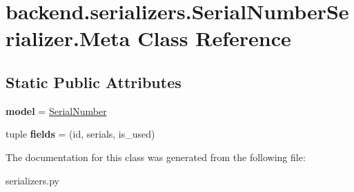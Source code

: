 \hypertarget{classbackend_1_1serializers_1_1_serial_number_serializer_1_1_meta}{}\section{backend.\+serializers.\+Serial\+Number\+Serializer.\+Meta Class Reference}
\label{classbackend_1_1serializers_1_1_serial_number_serializer_1_1_meta}
\subsection*{Static Public Attributes}
\begin{DoxyCompactItemize}
\item 
\mbox{\label{classbackend_1_1serializers_1_1_serial_number_serializer_1_1_meta_a10bd241c79ff0b305cb5ab32927fbafa}} 
{\bfseries model} = \hyperlink{classbackend_1_1models_1_1_serial_number}{Serial\+Number}
\item 
\mbox{\label{classbackend_1_1serializers_1_1_serial_number_serializer_1_1_meta_aa0c41685a36666a77fb4411e6c840c33}} 
tuple {\bfseries fields} = (\textquotesingle{}id\textquotesingle{}, \textquotesingle{}serials\textquotesingle{}, \textquotesingle{}is\+\_\+used\textquotesingle{})
\end{DoxyCompactItemize}


The documentation for this class was generated from the following file\+:\begin{DoxyCompactItemize}
\item 
serializers.\+py\end{DoxyCompactItemize}
